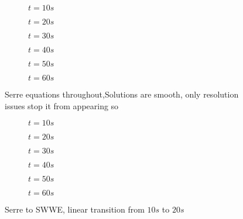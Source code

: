 \documentclass[10pt]{article}
\begin{document}
\begin{figure}
	\centering
	\begin{subfigure}{0.49\textwidth}
		\centering
		
		\caption{$t=10s$}
	\end{subfigure}
	\begin{subfigure}{0.49\textwidth}
		\centering
		
		\caption{$t=20s$}
	\end{subfigure}
	\begin{subfigure}{0.49\textwidth}
		\centering
		
		\caption{$t=30s$}
	\end{subfigure}
	\begin{subfigure}{0.49\textwidth}
		\centering
		
		\caption{$t=40s$}
	\end{subfigure}
	\begin{subfigure}{0.49\textwidth}
		\centering
		
		\caption{$t=50s$}
	\end{subfigure}
	\begin{subfigure}{0.49\textwidth}
		\centering
		
		\caption{$t=60s$}
	\end{subfigure}
	\caption{Serre equations throughout,Solutions are smooth, only resolution issues stop it from appearing so}
\end{figure}


\begin{figure}
	\centering
	\begin{subfigure}{0.49\textwidth}
		\centering
		
		\caption{$t=10s$}
	\end{subfigure}
	\begin{subfigure}{0.49\textwidth}
		\centering
		
		\caption{$t=20s$}
	\end{subfigure}
	\begin{subfigure}{0.49\textwidth}
		\centering
		
		\caption{$t=30s$}
	\end{subfigure}
	\begin{subfigure}{0.49\textwidth}
		\centering
		
		\caption{$t=40s$}
	\end{subfigure}
	\begin{subfigure}{0.49\textwidth}
		\centering
		
		\caption{$t=50s$}
	\end{subfigure}
	\begin{subfigure}{0.49\textwidth}
		\centering
		
		\caption{$t=60s$}
	\end{subfigure}
\caption{ Serre to SWWE, linear transition from $10s$ to $20s$}
\end{figure}
\end{document}
